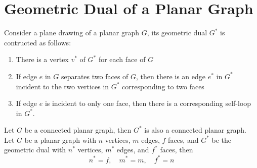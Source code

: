 \section{Geometric Dual of a Planar Graph}
\begin{definition}
Consider a plane drawing of a planar graph $G$, its geometric dual $G^*$ is contructed as follows:
\begin{enumerate}
\item
There is a vertex $v^*$ of $G^*$ for each face of $G$
\item
If edge $e$ in $G$ separates two faces of $G$, then there is an edge $e^*$ in $G^*$ incident to the two vertices in $G^*$ corresponding to two faces
\item
If edge $e$ is incident to only one face, then there is a corresponding self-loop in $G^*$.
\end{enumerate}
\end{definition}
 
\begin{lemma}
Let $G$ be a connected planar graph, then $G^*$ is also a connected planar graph.
Let $G$ be a planar graph with $n$ vertices, $m$ edges, $f$ faces, and $G^*$ be the geometric dual with $n^*$ vertices, $m^*$ edges, and $f^*$ faces, then
\[
n^*=f,\quad
m^*=m,\quad
f^*=n
\]
\end{lemma}

